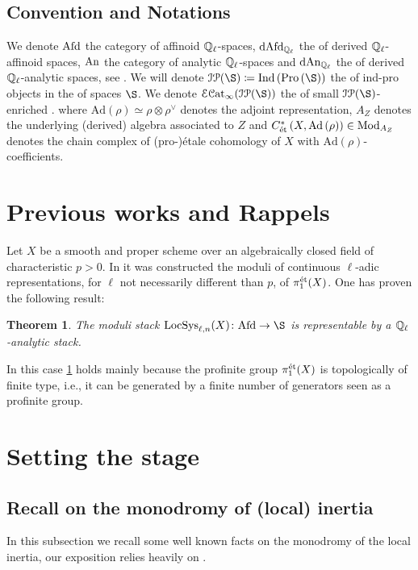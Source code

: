 \documentclass[10pt,a4paper]{amsart}
\numberwithin{equation}{subsection}
\theoremstyle{plain}
\newtheorem{theorem}{Theorem}[section]
\theoremstyle{definition}
\theoremstyle{remark}
\numberwithin{equation}{section}
\begin{document}
\subsection{Convention and Notations} We denote $\mathrm{Afd}$ the category of affinoid $\mathbb{Q}_\ell$-spaces, $\mathrm{dAfd}_{\mathbb{Q}_\ell}$ the \infcat of derived $\mathbb{Q}_\ell$-affinoid spaces, $\mathrm{An}$ the category of analytic $\mathbb{Q}_\ell$-spaces and $\mathrm{dAn}_{\mathbb{Q}_\ell}$ the \infcat of derived $\mathbb{Q}_\ell$-analytic
spaces, see \cite[Definition 7.3]{porta_der}. We will denote $\cI \cP(\S) \coloneqq \ind \left( \pro \left( \S \right) \right)$ the \infcat of ind-pro objects in the \infcat of spaces $\S$. We denote $ \cE \Cat (\cI \cP(\S))$ the \infcat of
small $\cI \cP (\S)$-enriched \infcats.
where $\mathrm{Ad} \left( \rho \right) \simeq \rho \otimes \rho^\vee$ denotes the adjoint representation, $A_Z$ denotes the underlying (derived) algebra associated to $Z$ and $C^*_{\text{\'et}}\left(X, \mathrm{Ad} \left( \rho \right) \right) \in \mathrm{Mod}_{A_Z}$ denotes
the chain complex of (pro-)\'etale cohomology of $X$ with $\mathrm{Ad} (\rho)$-coefficients. 


\section{Previous works and Rappels}
Let $X$ be a smooth and proper scheme over an algebraically closed field of characteristic $p>0$. In \cite{me1} it was constructed the moduli of continuous $\ell$-adic representations, for $\ell$ not necessarily different than $p$, of $\pi_1^{\text{\'et}}(X)$.
One has proven the following result:

\begin{theorem} \label{before}
The moduli stack $\LocSys(X) \colon \Afd \to \S$ is representable by a $\mathbb{Q}_\ell$-analytic stack.
\end{theorem}

In this case \cref{before} holds mainly because the profinite group $\pi_1^{\text{\'et}}(X)$ is topologically of finite type, i.e., it can be generated by a finite number of generators seen as a profinite group. 
\section{Setting the stage}

\subsection{Recall on the monodromy of (local) inertia} In this subsection we recall some well known facts on the monodromy of the local inertia, our exposition relies heavily on \cite{fontaine_ouyang}.
\end{document}
